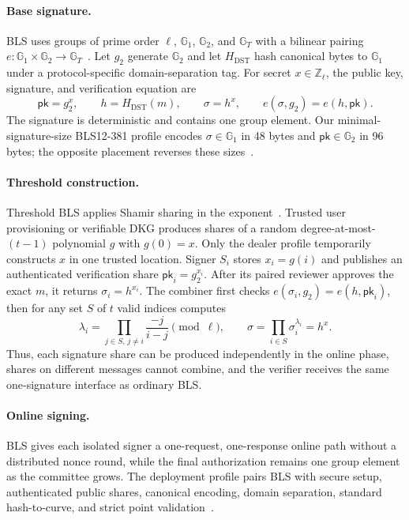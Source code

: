 \documentclass{article}
\newcommand{\pk}{\mathsf{pk}}
\newcommand{\Zq}{\mathbb{Z}_\ell}
\begin{document}
\paragraph{Base signature.}
BLS uses groups of prime order $\ell$,
$\mathbb{G}_1$, $\mathbb{G}_2$, and
$\mathbb{G}_T$ with a bilinear pairing
$e:\mathbb{G}_1\times\mathbb{G}_2\rightarrow\mathbb{G}_T$~\citep{bls2001}.
Let $g_2$ generate $\mathbb{G}_2$ and let
$H_{\mathrm{DST}}$ hash canonical bytes to $\mathbb{G}_1$ under a
protocol-specific domain-separation tag. For secret $x\in\Zq$, the public key,
signature, and verification equation are
\begin{equation}
  \pk=g_2^x,\qquad h=H_{\mathrm{DST}}(m),\qquad
  \sigma=h^x,\qquad e(\sigma,g_2)=e(h,\pk).
\end{equation}
The signature is deterministic and contains one group element. Our
minimal-signature-size BLS12-381 profile encodes $\sigma\in\mathbb{G}_1$ in 48
bytes and $\pk\in\mathbb{G}_2$ in 96 bytes; the opposite placement reverses
these sizes~\citep{blsdraft2026}.

\paragraph{Threshold construction.}
Threshold BLS applies Shamir sharing in the exponent~\citep{boldyreva2003}.
Trusted user provisioning or verifiable DKG produces shares of a random
degree-at-most-$(t-1)$ polynomial $g$ with $g(0)=x$.
Only the dealer profile temporarily constructs $x$ in one trusted location.
Signer $S_i$ stores $x_i=g(i)$ and publishes an
authenticated verification share $\pk_i=g_2^{x_i}$. After its paired reviewer
approves the exact $m$, it returns $\sigma_i=h^{x_i}$. The combiner first checks
$e(\sigma_i,g_2)=e(h,\pk_i)$, then for any set $S$ of $t$ valid indices computes
\begin{equation}
  \lambda_i=\prod_{j\in S,\,j\ne i}\frac{-j}{i-j}\pmod\ell,
  \qquad
  \sigma=\prod_{i\in S}\sigma_i^{\lambda_i}=h^x.
\end{equation}
Thus, each signature share can be produced independently in the online phase,
shares on different messages cannot combine, and the verifier receives the same
one-signature interface as ordinary BLS.

\paragraph{Online signing.}
BLS gives each isolated signer a one-request, one-response online path without a
distributed nonce round, while the final authorization remains one group
element as the committee grows. The deployment profile pairs BLS with secure setup,
authenticated public shares, canonical encoding, domain separation, standard
hash-to-curve, and strict point validation~\citep{rfc9380,blsdraft2026}.
\end{document}
